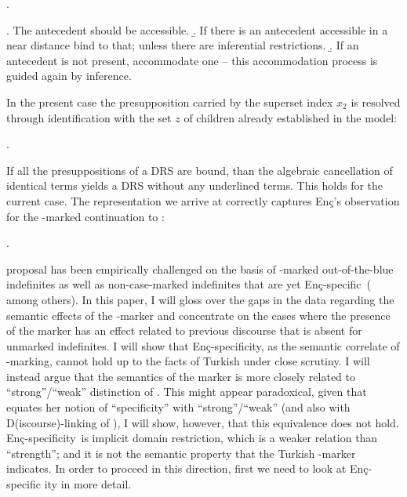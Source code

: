 \documentclass[11pt,a4paper]{article}
\newcommand{\encspec}{Enç-specific}
\begin{document}
\ex.

\a. The antecedent should be accessible.
\b. If there is an antecedent accessible in a near distance bind to
that; unless there are inferential restrictions.
\b. If an antecedent is not present, accommodate one -- this
accommodation process is guided again by inference.

In the present case the presupposition carried by the superset index $x_2$ is
resolved through identification with the set $z$ of children already
established in the model:

\ex.


If all the presuppositions of a DRS are bound, than the algebraic cancellation of identical terms yields a DRS without any underlined terms. This holds for the current case. The representation we arrive at correctly captures Enç's observation for the \acc-marked continuation to :

\ex.

 proposal has been empirically challenged on the basis of
\acc-marked out-of-the-blue indefinites as well as non-case-marked
indefinites that are yet \encspec\
(
among others).  In this paper, I will gloss over the gaps in the data
regarding the semantic effects of the \acc-marker and concentrate on
the cases where the presence of the marker has an effect related to
previous discourse that is absent for unmarked indefinites. I will
show that \encspec ity, as the semantic correlate of \acc-marking,
cannot hold up to the facts of Turkish under close scrutiny. I will
instead argue that the semantics of the marker is more closely related
to ``strong''/``weak'' distinction of \ctnm{milsark77}.  This might
appear paradoxical, given that \ctnm{enc91} equates her notion of
``specificity'' with ``strong''/``weak'' (and also with
D(iscourse)-linking of ), I will show, however, that
this equivalence does not hold.  \encspec ity\ is implicit domain
restriction, which is a weaker relation than ``strength''; and it is
not the semantic property that the Turkish \acc-marker indicates. In
order to proceed in this direction, first we need to look at \encspec
ity in more detail.
\end{document}
